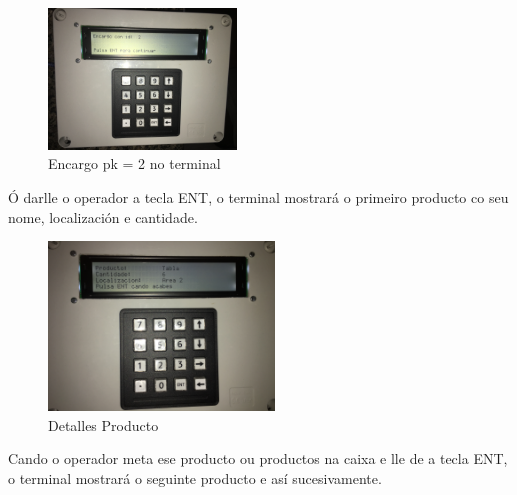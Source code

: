 \documentclass[11pt,twoside]{book}
\begin{document}
\begin{figure}[H]
	\begin{center}
		\includegraphics[width=5cm]{images/id_encargo.JPG}
	\end{center}
	\caption{Encargo pk = 2 no terminal}
	\label{fig:Encargo1}
\end{figure}



Ó darlle o operador a tecla ENT, o terminal mostrará o primeiro producto co seu nome, localización e cantidade. 

\begin{figure}[H]
	\begin{center}
		\includegraphics[width=6cm]{images/detalles_producto.JPG}
	\end{center}
	\caption{Detalles Producto}
	\label{fig:Encargo1}
\end{figure}

Cando o operador meta ese producto ou productos na caixa e lle de a tecla ENT, o terminal mostrará o seguinte producto e así sucesivamente.
\end{document}
